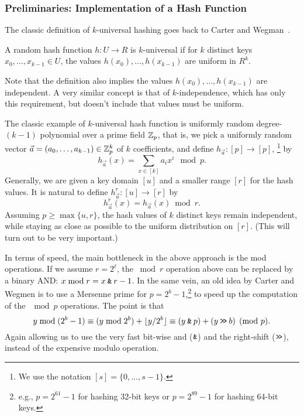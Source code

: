 \subsubsection{Preliminaries: Implementation of a Hash Function}
The classic definition of $k$-universal hashing
goes back to Carter and Wegman~\cite{wegman81kwise}.
\begin{definition}
   A random hash function $h:U\to R$ is $k$-universal if for $k$
   distinct keys $x_0,\ldots,x_{k-1}\in U$, the values
   $h(x_0),\ldots,h(x_{k-1})$ are uniform in $R^k$.
\end{definition}
\noindent
Note that the definition also implies the values 
$h(x_0),\ldots,h(x_{k-1})$ are independent.
A very similar concept is that of $k$-independence, which has only this requirement, but doesn't include that values must be uniform.

The classic example of $k$-universal
hash function is uniformly random degree-$(k-1)$ polynomial over a prime field
$\mathbb Z_p$, that is, we pick a uniformly random vector
$\vec a=(a_0,\ldots,a_{k-1})\in \mathbb Z_p^k$ of $k$ coefficients, and define
$h_{\vec a}:[p]\to[p]$,
\footnote{ We use the notation $[s]=\{0,\ldots,s-1\}$.  }
   by 
\[h_{\vec a}(x)=\sum_{x\in[k]}a_i x^i \mod p.\]
%
Generally, we are given a key domain $[u]$ and a smaller range $[r]$ for the hash values.
It is natural to define
$h^r_{\vec a}:[u]\to[r]$ by
\[h^r_{\vec a}(x)=h_{\vec a}(x)\bmod r.\]
Assuming $p\geq \max\{u,r\}$, the hash values of $k$ distinct keys remain independent,
while staying as close as possible to the uniform distribution on $[r]$.
(This will turn out to be very important.)

In terms of speed, the main bottleneck in the above approach is the mod operations.
If we assume $r=2^\ell$, the $\bmod r$ operation above can be replaced by a binary AND: $x \bmod r = x \mathbin{\texttt{\&}} r-1$.
In the same vein, an old idea by 
Carter and Wegmen \cite{carter77universal} is to use a
Mersenne prime for $p=2^b-1$,\footnote{e.g., $p=2^{61}-1$ for hashing 32-bit keys or
$p=2^{89}-1$ for hashing 64-bit keys.}
to speed up the computation of the $\mod p$ operations.
The point is that
\begin{equation}
   y \bmod (2^b-1)
   \equiv (y\bmod 2^{b}) + \lfloor {y/2^b} \rfloor
   \equiv (y \mathbin{\texttt{\&}} p) + (y \mathbin{\texttt{>\!>}} b)
   \pmod {p}.
   \label{eq:Mersenne}
\end{equation}
Again allowing us to use the very fast bit-wise {\sc and} ($\mathbin{\texttt{\&}}$) and the right-shift ($\mathbin{\texttt{>\!>}}$),
instead of the expensive modulo operation.


